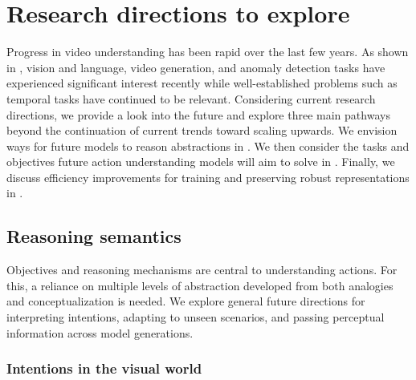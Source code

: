 \section{Research directions to explore}
\label{sec:outlook}

Progress in video understanding has been rapid over the last few years. As shown in , vision and language, video generation, and anomaly detection tasks have experienced significant interest recently while well-established problems such as temporal tasks have continued to be relevant. Considering current research directions, we provide a look into the future and explore three main pathways beyond the continuation of current trends toward scaling upwards. We envision ways for future models to reason abstractions in . We then consider the tasks and objectives future action understanding models will aim to solve in . Finally, we discuss efficiency improvements for training and preserving robust representations in .





\subsection{Reasoning semantics}
\label{sec:outlook::reason}


Objectives and reasoning mechanisms are central to understanding actions. For this, a reliance on multiple levels of abstraction developed from both analogies and conceptualization is needed. We explore general future directions for interpreting intentions, adapting to unseen scenarios, and passing perceptual information across model generations. 


\subsubsection{Intentions in the visual world}

